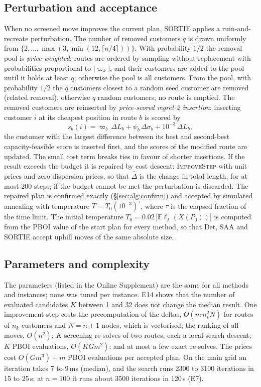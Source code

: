 \documentclass[11pt]{article}
\theoremstyle{definition}
\newcommand{\E}{\mathbb{E}}
\newcommand{\lord}{\ell_\lambda}
\begin{document}
\subsection{Perturbation and acceptance}\label{sec:alg:perturb}
When no screened move improves the current plan, SORTIE applies a
ruin-and-recreate perturbation. The number of removed customers $q$ is drawn
uniformly from $\{2,\dots,\max(3,\min(12,\lceil n/4\rceil))\}$. With
probability $1/2$ the removal pool is \emph{price-weighted}: routes are
ordered by sampling without replacement with probabilities proportional to
$|\varpi_k|$, and their customers are added to the pool until it holds at
least $q$; otherwise the pool is all customers. From the pool, with
probability $1/2$ the $q$ customers closest to a random seed customer are
removed (related removal), otherwise $q$ random customers; no route is
emptied. The removed customers are reinserted by \emph{price-scored regret-2
insertion}: inserting customer $i$ at its cheapest position in route $b$ is
scored by
\[
s_b(i)=\varpi_b\,\Delta L_b+\psi_b\,\Delta\sigma_b+10^{-3}\,\Delta L_b,
\]
the customer with the largest difference between its best and second-best
capacity-feasible score is inserted first, and the scores of the modified
route are updated. The small cost term breaks ties in favour of shorter
insertions. If the result exceeds the budget it is repaired by cost descent:
\textsc{ImproveStep} with unit prices and zero dispersion prices, so that
$\hat\Delta$ is the change in total length, for at most 200 steps; if the
budget cannot be met the perturbation is discarded. The repaired plan is
confirmed exactly (\S\ref{sec:alg:confirm}) and accepted by simulated
annealing with temperature $T=T_0(10^{-3})^{\tau}$, where $\tau$ is the
elapsed fraction of the time limit. The initial temperature
$T_0=0.02\,|\E\lord(X(P_0))|$ is computed from the PBOI value of the start
plan for every method, so that Det, SAA and SORTIE accept uphill moves of the
same absolute size.

\subsection{Parameters and complexity}\label{sec:alg:params}
The parameters (listed in the Online Supplement) are the same for all methods and instances; none was tuned per instance.
E14 shows that the number of evaluated candidates $K$ between 1 and 32 does not
change the median result. One improvement step costs the precomputation of
the deltas, $O(m\,n_k^2N)$ for routes of $n_k$ customers and $N=n+1$ nodes,
which is vectorised; the ranking of all moves, $O(n^2)$; $K$ screening
re-solves of two routes, each a local-search descent; $K$ PBOI evaluations,
$O(KGm^2)$; and at most a few exact re-solves. The prices cost
$O(Gm^3)+m$ PBOI evaluations per accepted plan. On the main grid an iteration takes 7 to 9\,ms (median), and the search
runs 2300 to 3100 iterations in 15 to 25\,s; at $n=100$ it runs about 3500
iterations in 120\,s (E7).
\end{document}

